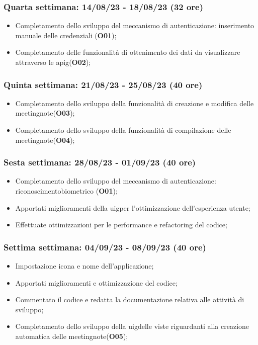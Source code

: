 \subsubsection{Quarta settimana: 14/08/23 - 18/08/23 (32 ore)}
    \begin{itemize}
        \item Completamento dello sviluppo del meccanismo di autenticazione: inserimento manuale delle
        credenziali (\textbf{O01});
        \item Completamento delle funzionalità di ottenimento dei dati da visualizzare attraverso le \gls{apig}\glsoccur (\textbf{O02});
    \end{itemize}
\subsubsection{Quinta settimana: 21/08/23 - 25/08/23 (40 ore)}
    \begin{itemize}
        \item Completamento dello sviluppo della funzionalità di creazione e modifica delle \gls{meetingnote}\glsoccur (\textbf{O03});
        \item Completamento dello sviluppo della funzionalità di compilazione delle \gls{meetingnote}\glsoccur (\textbf{O04});
    \end{itemize}
\subsubsection{Sesta settimana: 28/08/23 - 01/09/23 (40 ore)}
    \begin{itemize}
        \item Completamento dello sviluppo del meccanismo di autenticazione: \gls{riconoscimentobiometrico} (\textbf{O01});
        \item Apportati miglioramenti della \gls{uig}\glsoccur per l'ottimizzazione dell'esperienza utente;
        \item Effettuate ottimizzazioni per le performance e refactoring del codice;
    \end{itemize}
\subsubsection{Settima settimana: 04/09/23 - 08/09/23 (40 ore)}
    \begin{itemize}
        \item Impostazione icona e nome dell'applicazione;
        \item Apportati miglioramenti e ottimizzazione del codice;
        \item Commentato il codice e redatta la documentazione relativa alle attività di sviluppo;
        \item Completamento dello sviluppo della \gls{uig}\glsoccur delle viste riguardanti alla creazione automatica delle \gls{meetingnote}\glsoccur  (\textbf{O05});
    \end{itemize}
